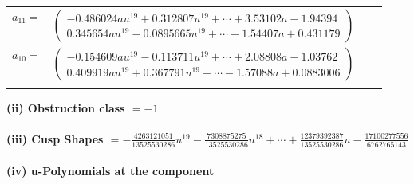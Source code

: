 \documentclass[1p]{elsarticle_modified}
\theoremstyle{definition}
\begin{document}
\begin{tabular}{m{7pt} m{180pt} m{7pt} m{180pt} }
\flushright $a_{11}=$&$\begin{pmatrix}-0.486024 a u^{19}+0.312807 u^{19}+\cdots+3.53102 a-1.94394\\0.345654 a u^{19}-0.0895665 u^{19}+\cdots-1.54407 a+0.431179\end{pmatrix}$ \\
\flushright $a_{10}=$&$\begin{pmatrix}-0.154609 a u^{19}-0.113711 u^{19}+\cdots+2.08808 a-1.03762\\0.409919 a u^{19}+0.367791 u^{19}+\cdots-1.57088 a+0.0883006\end{pmatrix}$\\&\end{tabular}
\flushleft \textbf{(ii) Obstruction class $= -1$}\\~\\
\flushleft \textbf{(iii) Cusp Shapes $= -\frac{4263121051}{13525530286} u^{19}-\frac{7308875275}{13525530286} u^{18}+\cdots+\frac{12379392387}{13525530286} u-\frac{17100277556}{6762765143}$}\\~\\
\newpage\renewcommand{\arraystretch}{1}
\flushleft \textbf{(iv) u-Polynomials at the component}\newline \\
\end{document}
